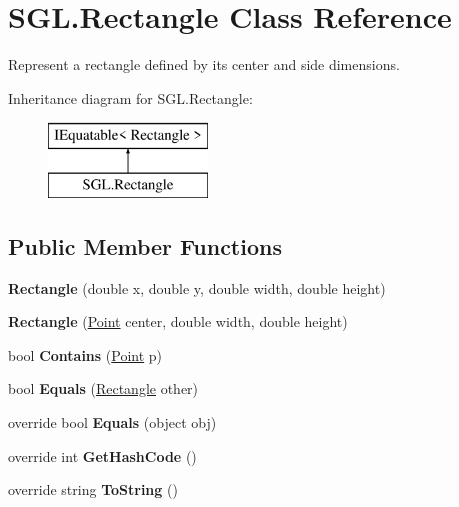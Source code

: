 \hypertarget{class_s_g_l_1_1_rectangle}{}\section{S\+G\+L.\+Rectangle Class Reference}
\label{class_s_g_l_1_1_rectangle}


Represent a rectangle defined by its center and side dimensions.  


Inheritance diagram for S\+G\+L.\+Rectangle\+:\begin{figure}[H]
\begin{center}
\leavevmode
\includegraphics[height=2.000000cm]{class_s_g_l_1_1_rectangle}
\end{center}
\end{figure}
\subsection*{Public Member Functions}
\begin{DoxyCompactItemize}
\item 
\mbox{\label{class_s_g_l_1_1_rectangle_a434c1422826c0ca43b7d4cd269f36c77}} 
{\bfseries Rectangle} (double x, double y, double width, double height)
\item 
\mbox{\label{class_s_g_l_1_1_rectangle_ab483c2330a3e5b46236e5b11d2a7bd90}} 
{\bfseries Rectangle} (\mbox{\hyperlink{struct_s_g_l_1_1_point}{Point}} center, double width, double height)
\item 
\mbox{\label{class_s_g_l_1_1_rectangle_a46cb3c0ffdcc2e5ba34fd567cafaff5c}} 
bool {\bfseries Contains} (\mbox{\hyperlink{struct_s_g_l_1_1_point}{Point}} p)
\item 
\mbox{\label{class_s_g_l_1_1_rectangle_ade356368b8bc714fba5420b3996bd69f}} 
bool {\bfseries Equals} (\mbox{\hyperlink{class_s_g_l_1_1_rectangle}{Rectangle}} other)
\item 
\mbox{\label{class_s_g_l_1_1_rectangle_a4d8163b12df6d3bb94afcbd750e970d8}} 
override bool {\bfseries Equals} (object obj)
\item 
\mbox{\label{class_s_g_l_1_1_rectangle_aa75086e37d8fbe1d62d147a017de4e37}} 
override int {\bfseries Get\+Hash\+Code} ()
\item 
\mbox{\label{class_s_g_l_1_1_rectangle_aa0e5c1a75a41412c7c7df8b037f667f9}} 
override string {\bfseries To\+String} ()
\end{DoxyCompactItemize}
